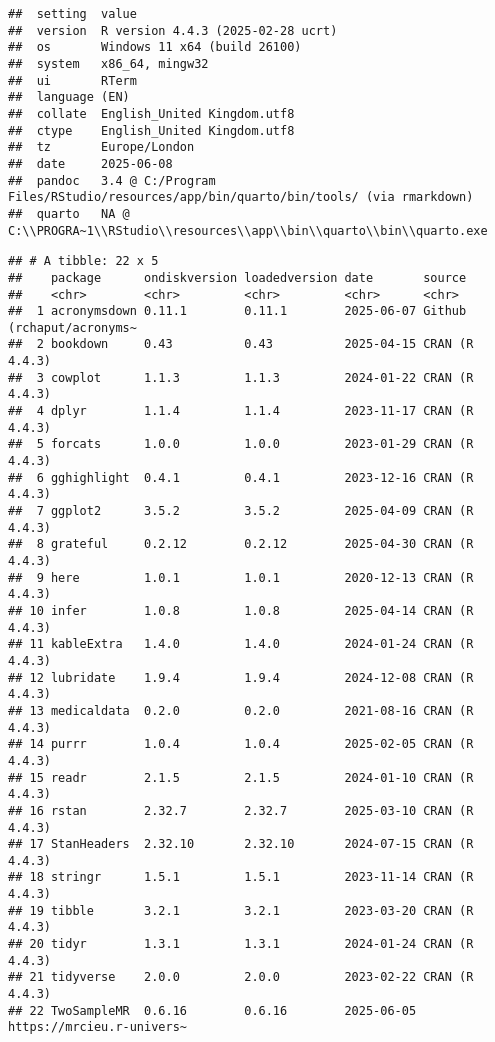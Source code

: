 \documentclass[
]{article}
\begin{document}
\begin{verbatim}
##  setting  value
##  version  R version 4.4.3 (2025-02-28 ucrt)
##  os       Windows 11 x64 (build 26100)
##  system   x86_64, mingw32
##  ui       RTerm
##  language (EN)
##  collate  English_United Kingdom.utf8
##  ctype    English_United Kingdom.utf8
##  tz       Europe/London
##  date     2025-06-08
##  pandoc   3.4 @ C:/Program Files/RStudio/resources/app/bin/quarto/bin/tools/ (via rmarkdown)
##  quarto   NA @ C:\\PROGRA~1\\RStudio\\resources\\app\\bin\\quarto\\bin\\quarto.exe
\end{verbatim}

\begin{verbatim}
## # A tibble: 22 x 5
##    package      ondiskversion loadedversion date       source                   
##    <chr>        <chr>         <chr>         <chr>      <chr>                    
##  1 acronymsdown 0.11.1        0.11.1        2025-06-07 Github (rchaput/acronyms~
##  2 bookdown     0.43          0.43          2025-04-15 CRAN (R 4.4.3)           
##  3 cowplot      1.1.3         1.1.3         2024-01-22 CRAN (R 4.4.3)           
##  4 dplyr        1.1.4         1.1.4         2023-11-17 CRAN (R 4.4.3)           
##  5 forcats      1.0.0         1.0.0         2023-01-29 CRAN (R 4.4.3)           
##  6 gghighlight  0.4.1         0.4.1         2023-12-16 CRAN (R 4.4.3)           
##  7 ggplot2      3.5.2         3.5.2         2025-04-09 CRAN (R 4.4.3)           
##  8 grateful     0.2.12        0.2.12        2025-04-30 CRAN (R 4.4.3)           
##  9 here         1.0.1         1.0.1         2020-12-13 CRAN (R 4.4.3)           
## 10 infer        1.0.8         1.0.8         2025-04-14 CRAN (R 4.4.3)           
## 11 kableExtra   1.4.0         1.4.0         2024-01-24 CRAN (R 4.4.3)           
## 12 lubridate    1.9.4         1.9.4         2024-12-08 CRAN (R 4.4.3)           
## 13 medicaldata  0.2.0         0.2.0         2021-08-16 CRAN (R 4.4.3)           
## 14 purrr        1.0.4         1.0.4         2025-02-05 CRAN (R 4.4.3)           
## 15 readr        2.1.5         2.1.5         2024-01-10 CRAN (R 4.4.3)           
## 16 rstan        2.32.7        2.32.7        2025-03-10 CRAN (R 4.4.3)           
## 17 StanHeaders  2.32.10       2.32.10       2024-07-15 CRAN (R 4.4.3)           
## 18 stringr      1.5.1         1.5.1         2023-11-14 CRAN (R 4.4.3)           
## 19 tibble       3.2.1         3.2.1         2023-03-20 CRAN (R 4.4.3)           
## 20 tidyr        1.3.1         1.3.1         2024-01-24 CRAN (R 4.4.3)           
## 21 tidyverse    2.0.0         2.0.0         2023-02-22 CRAN (R 4.4.3)           
## 22 TwoSampleMR  0.6.16        0.6.16        2025-06-05 https://mrcieu.r-univers~
\end{verbatim}

\newpage
\end{document}
